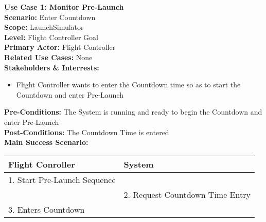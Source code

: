 \documentclass[letterpaper]{article}
\begin{document}
\noindent
\textbf{Use Case 1:  Monitor Pre-Launch}\\
\textbf{Scenario:  }Enter Countdown\\
\textbf{Scope:  }LaunchSimulator\\
\textbf{Level:  }Flight Controller Goal\\
\textbf{Primary Actor:  }Flight Controller\\
\textbf{Related Use Cases:  }None\\
\textbf{Stakeholders \& Interrests:  }
\begin{itemize}
\item Flight Controller wants to enter the Countdown time so as to
start the Countdown and enter Pre-Launch
\end{itemize}
\textbf{Pre-Conditions:  }The System is running and ready to begin
the Countdown and enter Pre-Launch\\
\textbf{Post-Conditions:  }The Countdown Time is entered\\
\textbf{Main Success Scenario:  }\\
\begin{tabular}{|p{5.75cm}|p{5.75cm}|}\hline
\textbf{Flight Conroller} & \textbf{System}\\\hline
1.  Start Pre-Launch Sequence &\\\hline
& 2.  Request Countdown Time Entry\\\hline
3.  Enters Countdown &\\\hline
\end{tabular}
\end{document}
